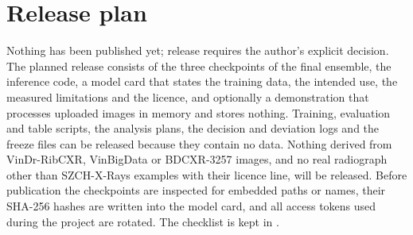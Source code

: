 \section{Release plan}
Nothing has been published yet; release requires the author's explicit decision. The planned release consists of the three checkpoints of the
final ensemble, the inference code, a model card that states the training data, the intended use, the measured limitations and the licence,
and optionally a demonstration that processes uploaded images in memory and stores nothing. Training, evaluation and table scripts, the
analysis plans, the decision and deviation logs and the freeze files can be released because they contain no data. Nothing derived from
VinDr-RibCXR, VinBigData or BDCXR-3257 images, and no real radiograph other than SZCH-X-Rays examples with their licence line, will be released.
Before publication the checkpoints are inspected for embedded paths or names, their SHA-256 hashes are written into the model card, and all
access tokens used during the project are rotated. The checklist is kept in .
